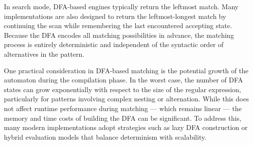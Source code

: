In search mode, DFA-based engines typically return the leftmost match. Many implementations are also designed to return the leftmost-longest match by continuing the scan while remembering the last encountered accepting state. Because the DFA encodes all matching possibilities in advance, the matching process is entirely deterministic and independent of the syntactic order of alternatives in the pattern.

One practical consideration in DFA-based matching is the potential growth of the automaton during the compilation phase. In the worst case, the number of DFA states can grow exponentially with respect to the size of the regular expression, particularly for patterns involving complex nesting or alternation. While this does not affect runtime performance during matching — which remains linear — the memory and time costs of building the DFA can be significant. To address this, many modern implementations adopt strategies such as lazy DFA construction or hybrid evaluation models that balance determinism with scalability.


%

